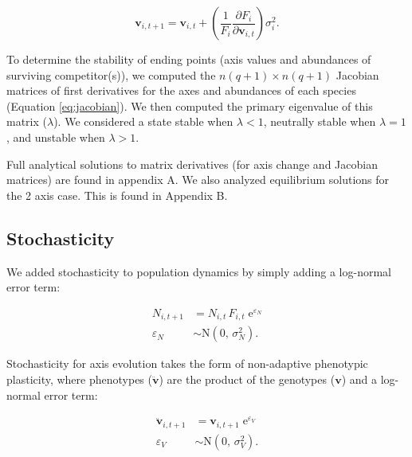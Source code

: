 \begin{equation} \label{eq:axis-change}
    \mathbf{v}_{i,t+1} = \mathbf{v}_{i,t} + \left( \frac{1}{F_i}
        \frac{\partial F_i}{\partial \mathbf{v}_{i,t}} \right) \sigma^2_i
    \textrm{.}
\end{equation}

To determine the stability of ending points (axis values and abundances of
surviving competitor(s)), we computed the $n (q+1) \times n (q+1)$ Jacobian matrices
of first derivatives for the axes and abundances of each species (Equation \ref{eq:jacobian}).
We then computed the primary eigenvalue of this matrix ($\lambda$).
We considered a state stable when $\lambda < 1$,
neutrally stable when $\lambda = 1$,
and unstable when $\lambda > 1$.

Full analytical solutions to matrix derivatives (for axis change and
Jacobian matrices) are found in appendix A.
We also analyzed equilibrium solutions for the 2 axis case.
This is found in Appendix B.


\subsection*{Stochasticity}

We added stochasticity to population dynamics by simply adding 
a log-normal error term:

\begin{equation} \label{eq:N-stochasticity}
\begin{split}
    N_{i,t+1} &= N_{i,t} \, F_{i,t} \; \text{e}^{\varepsilon_N} \\
    \varepsilon_N &\sim \text{N}(0, \, \sigma^2_N)
    \text{.}
\end{split}
\end{equation}


Stochasticity for axis evolution takes the form of non-adaptive
phenotypic plasticity,
where phenotypes ($\mathbf{\ddot{v}}$) are the product of the
genotypes ($\mathbf{v}$) and a log-normal error term:

\begin{equation} \label{eq:V-stochasticity}
\begin{split}
    \mathbf{\ddot{v}}_{i,t+1} &= \mathbf{v}_{i,t+1} \; \text{e}^{\varepsilon_V} \\
    \varepsilon_V &\sim \text{N}(0, \, \sigma^2_V)
    \text{.}
\end{split}
\end{equation}

